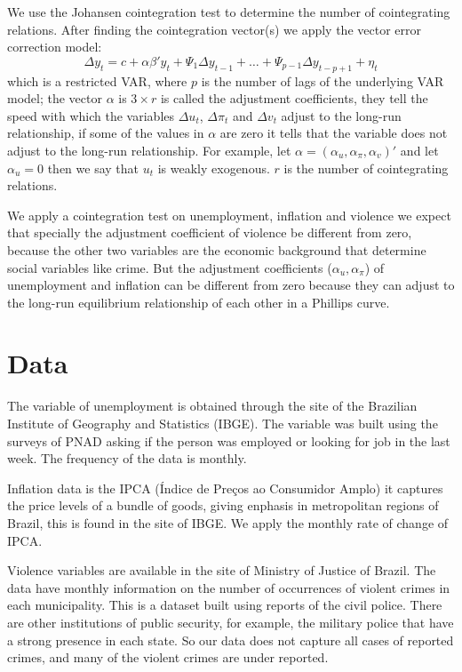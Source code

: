 \documentclass[11pt, a4paper]{article}
\begin{document}
We use the Johansen cointegration test to determine the number of cointegrating relations. After finding the cointegration vector(s) we apply the vector error correction model:
$$ \Delta y_t = c + \alpha \beta'y_t + \Psi_1 \Delta y_{t-1} + \dots + \Psi_{p-1} \Delta y_{t-p+1} + \eta_t $$
which is a restricted VAR, where $p$ is the number of lags of the underlying VAR model; the vector  $\alpha$ is $3 \times r$ is called the adjustment coefficients, they tell the speed with which the variables $\Delta u_t$, $\Delta \pi_t$ and $ \Delta v_t$ adjust to the long-run relationship, if some of the values in $\alpha$ are zero it tells that the variable does not adjust to the long-run relationship. For example, let $\alpha = (\alpha_u, \alpha_\pi, \alpha_v)'$ and let $\alpha_u = 0$ then we say that $u_t$ is weakly exogenous. $r$ is the number of cointegrating relations.

We apply a cointegration test on unemployment, inflation and violence we expect that specially the adjustment coefficient of violence be different from zero, because the other two variables are the economic background that determine social variables like crime. But the adjustment coefficients ($\alpha_u, \alpha_\pi$)  of unemployment and inflation can be different from zero because they can adjust to the long-run equilibrium relationship of each other in a Phillips curve. 



\section{Data}


The variable of unemployment is obtained through the site of the Brazilian Institute of Geography and Statistics (IBGE). The variable was built using the surveys of PNAD asking if the person was employed or looking for job in the last week. The frequency of the data is monthly.

Inflation data is the IPCA (Índice de Preços ao Consumidor Amplo) it captures the price levels of a bundle of goods, giving enphasis in metropolitan regions of Brazil, this is found in the site of IBGE. We apply the monthly rate of change of IPCA.

Violence variables are available in the site of Ministry of Justice of Brazil. The data have monthly information on the number of occurrences of violent crimes in each municipality. This is a dataset built  using reports of the civil police. There are other institutions of public security, for example, the  military police that have a strong presence in each state. So our data does not capture all cases of reported crimes, and many of the violent crimes are under reported.
\end{document}
